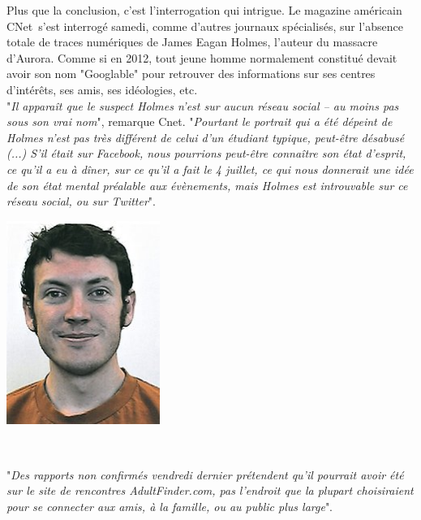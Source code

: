 \documentclass[11pt,twoside,a4paper]{article}
\begin{document}
\begin{minipage}[ht]{0.70\textwidth} 
Plus que la conclusion, c'est l'interrogation qui intrigue. Le magazine am{\'e}ricain CNet~\footnotemark s'est interrog{\'e} samedi, comme d'autres journaux sp{\'e}cialis{\'e}s, sur l'absence totale de traces num{\'e}riques de James Eagan Holmes, l'auteur du massacre d'Aurora. Comme si en 2012, tout jeune homme normalement constitu{\'e} devait avoir son nom "Googlable" pour retrouver des informations sur ses centres d'int{\'e}r{\^e}ts, ses amis, ses id{\'e}ologies, etc.~\\

"\emph{Il appara{\^i}t que le suspect Holmes n'est sur aucun r{\'e}seau social -- au moins pas sous son vrai nom}", remarque Cnet. "\emph{Pourtant le portrait qui a {\'e}t{\'e} d{\'e}peint de Holmes n'est pas tr{\`e}s diff{\'e}rent de celui d'un {\'e}tudiant typique, peut-{\^e}tre d{\'e}sabus{\'e} (...) S'il {\'e}tait sur Facebook, nous pourrions peut-{\^e}tre conna{\^i}tre son {\'e}tat d'esprit, ce qu'il a eu {\`a} d{\^i}ner, sur ce qu'il a fait le 4 juillet, ce qui nous donnerait une id{\'e}e de son {\'e}tat mental pr{\'e}alable aux {\'e}v{\`e}nements, mais Holmes est introuvable sur ce r{\'e}seau social, ou sur Twitter}".~\\
\end{minipage} \hfill \begin{minipage}[ht]{0.26\textwidth} 
	\includegraphics[width=5cm]{img/holmes.jpg}
\end{minipage}
~

"\emph{Des rapports non confirm{\'e}s vendredi dernier pr{\'e}tendent qu'il pourrait avoir {\'e}t{\'e} sur le site de rencontres AdultFinder.com, pas l'endroit que la plupart choisiraient pour se connecter aux amis, {\`a} la famille, ou au public plus large}".~\\
\end{document}
